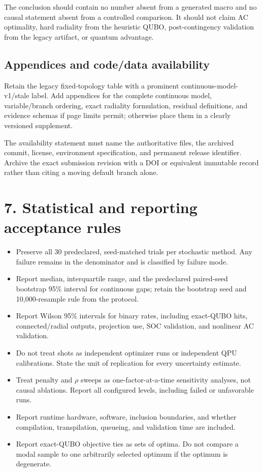 \documentclass[11pt]{article}
\begin{document}
The conclusion should contain no number absent from a generated macro and no
causal statement absent from a controlled comparison.  It should not claim
AC optimality, hard radiality from the heuristic QUBO, post-contingency
validation from the legacy artifact, or quantum advantage.

\subsection*{Appendices and code/data availability}

Retain the legacy fixed-topology table with a prominent
continuous-model-v1/stale label.  Add appendices for the complete continuous
model, variable/branch ordering, exact radiality formulation, residual
definitions, and evidence schemas if page limits permit; otherwise place them
in a clearly versioned supplement.

The availability statement must name the authoritative files, the archived
commit, license, environment specification, and permanent release identifier.
Archive the exact submission revision with a DOI or equivalent immutable
record rather than citing a moving default branch alone.

\section*{7. Statistical and reporting acceptance rules}

\begin{itemize}
  \item Preserve all 30 predeclared, seed-matched trials per stochastic method.
  Any failure remains in the denominator and is classified by failure mode.
  \item Report median, interquartile range, and the predeclared paired-seed
  bootstrap 95\% interval for continuous gaps; retain the bootstrap seed and
  10,000-resample rule from the protocol.
  \item Report Wilson 95\% intervals for binary rates, including exact-QUBO
  hits, connected/radial outputs, projection use, SOC validation, and
  nonlinear AC validation.
  \item Do not treat shots as independent optimizer runs or independent QPU
  calibrations.  State the unit of replication for every uncertainty estimate.
  \item Treat penalty and $\rho$ sweeps as one-factor-at-a-time sensitivity
  analyses, not causal ablations.  Report all configured levels, including
  failed or unfavorable runs.
  \item Report runtime hardware, software, inclusion boundaries, and whether
  compilation, transpilation, queueing, and validation time are included.
  \item Report exact-QUBO objective ties as sets of optima.  Do not compare a
  modal sample to one arbitrarily selected optimum if the optimum is
  degenerate.
\end{itemize}
\end{document}
